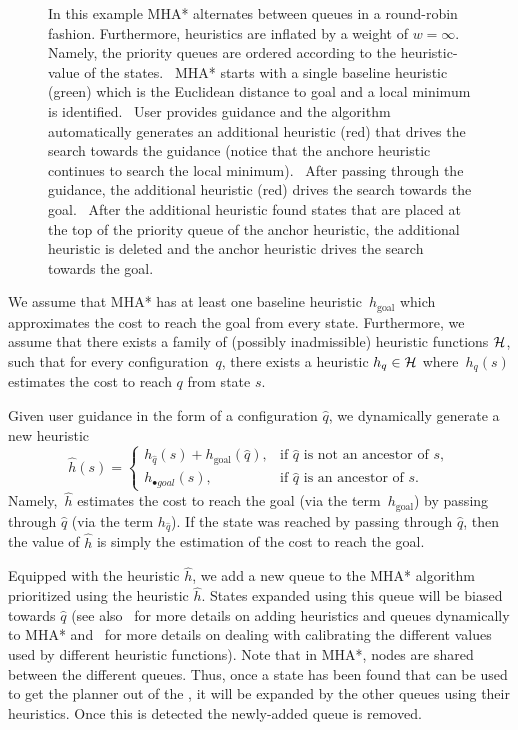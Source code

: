 \documentclass[conference]{IEEEtran}
\begin{document}
\begin{figure}[t]
{    %
    In this example MHA* alternates between queues in a round-robin fashion. Furthermore, heuristics are inflated by a weight of $w=\infty$. Namely, the priority queues are ordered according to the heuristic-value of the states.
	~MHA* starts with a single baseline heuristic (green) which is the Euclidean distance to goal and a local minimum is identified.
	~User provides guidance and the algorithm automatically generates an additional heuristic (red) that drives the search towards the guidance (notice that the anchore heuristic continues to search the local minimum).
	~After passing through the guidance, the additional heuristic (red) drives the search towards the goal.
	~After the additional heuristic found states that are placed at the top of the priority queue of the anchor heuristic, the additional heuristic is deleted and the anchor heuristic drives the search towards the goal.
  }%
  \label{fig:filmstrip-dynamic_heuristic}%
  \vspace{-2.5mm}
\end{figure}



We assume that MHA* has at least one baseline heuristic~$h_{\text{goal}}$ which approximates the cost to reach the goal from every state.
Furthermore, we assume that there exists a family of (possibly inadmissible) heuristic functions $\mathcal{H}$, such that for every configuration~$q$, there exists a heuristic $h_q \in \mathcal{H}$ where~$h_q(s)$ estimates the cost to reach $q$ from state $s$.

Given user guidance in the form of a configuration $\hat{q}$, we dynamically generate a new heuristic $$
    \hat{h}(s)= 
\begin{cases}
    h_{\hat{q}}(s) + h_{\text{goal}}(\hat{q}),	& 
    		\text{if } \hat{q} \text{ is not an ancestor of } s,\\
    h_{\textbf{•}{goal}}(s),            		& 
    		\text{if } \hat{q} \text{ is an ancestor of } s.
\end{cases}
$$
Namely,~$\hat{h}$ estimates the 
cost to reach the goal (via the term~$h_{\text{goal}}$) by passing through $\hat{q}$ (via the term $h_{\hat{q}}$). If the state was reached by passing through $\hat{q}$, then the value of $\hat{h}$ is simply the estimation of the cost to reach the goal.


Equipped with the heuristic $\hat{h}$, we add a new queue to the MHA* algorithm prioritized using the heuristic $\hat{h}$. %
States expanded using this queue will be biased towards $\hat{q}$ (see also~\cite{INL15} for more details on adding heuristics and queues dynamically to MHA*
and~\cite{NAL15} for more details on dealing with calibrating the different values used by different heuristic functions).
Note that in MHA*, nodes are shared between the different queues.
Thus, once a state has been found that can be used to get the planner out of the \noindent , it will be expanded by the other queues using their heuristics.
Once this is detected 
the newly-added queue is removed.
\end{document}
